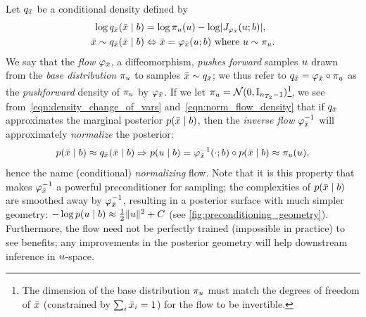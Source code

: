 Let $q_{\bar{x}}$ be a conditional density defined by
\begin{align}
    \log q_{\bar{\distbn}}(\bar{\distbn} \mid \signal)               & = \log \pi_{\vv{u}}(\vv{u}) - \log \AbsDet{\vv{J}_{\varphi_{\bar{\distbn}}}(\vv{u}; \signal)}, \label{eqn:norm_flow_density}                     \\
    \bar{\distbn} \sim q_{\bar{\distbn}}(\bar{\distbn} \mid \signal) & \Leftrightarrow \bar{\distbn} = \varphi_{\bar{\distbn}}(\vv{u}; \signal) \text{ where } \vv{u} \sim \pi_{\vv{u}}. \label{eqn:norm_flow_sampling}
\end{align}
We say that the \textit{flow} $\varphi_{\bar{x}}$, a diffeomorphism, \textit{pushes forward} samples $u$ drawn from the \textit{base distribution} $\pi_{u}$ to samples $\bar{x} \sim q_{\bar{x}}$;
we thus refer to $q_{\bar{x}} = \varphi_{\bar{x}} \circ \pi_{u}$ as the \textit{pushforward} density of $\pi_{u}$ by $\varphi_{\bar{x}}$.
If we let $\pi_{u} = \mathcal{N}(\mathrm{0}, \mathrm{I}_{n_{T_2}-1})$\footnote{The dimension of the base distribution $\pi_{u}$ must match the degrees of freedom of $\bar{x}$ (constrained by $\sum_{i} \bar{x}_i = 1$) for the flow to be invertible.},
we see from~\eqref{eqn:density_change_of_vars} and~\eqref{eqn:norm_flow_density} that if $q_{\bar{x}}$ approximates the marginal posterior $p(\bar{x} \mid b)$, then the \textit{inverse flow} $\varphi_{\bar{x}}^{-1}$ will approximately \textit{normalize} the posterior:
\begin{align*}
    p(\bar{x} \mid b) \approx q_{\bar{x}}(\bar{x} \mid b) \Rightarrow p(u \mid b) = \varphi_{\bar{x}}^{-1}(\cdot; b) \circ p(\bar{x} \mid b) \approx \pi_{u}(u),
\end{align*}
hence the name (conditional) \textit{normalizing} flow.
Note that it is this property that makes $\varphi_{\bar{x}}^{-1}$ a powerful preconditioner for sampling;
the complexities of $p(\bar{x} \mid b)$ are smoothed away by $\varphi_{\bar{x}}^{-1}$, resulting in a posterior surface with much simpler geometry: $-\log p(u \mid b) \approx \frac{1}{2} \lVert u \rVert^2 + C$ (see \cref{fig:preconditioning_geometry}).
Furthermore, the flow need not be perfectly trained (impossible in practice) to see benefits;
any improvements in the posterior geometry will help downstream inference in $u$-space.

